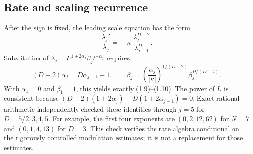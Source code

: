 \documentclass[10pt]{article}
\begin{document}
\subsection*{Rate and scaling recurrence}
After the sign is fixed, the leading scale equation has the form \[\frac{\lambda_j'}{\lambda_j}
   =-|\kappa|\frac{\lambda_j^{D-2}}{\lambda_{j-1}^{D}}.\] Substitution of \(\lambda_j=L^{1+2\alpha_j}\beta_jt^{-\alpha_j}\) requires \[(D-2)\alpha_j=D\alpha_{j-1}+1,\qquad
 \beta_j=\left(\frac{\alpha_j}{|\kappa|}\right)^{1/(D-2)}
          \beta_{j-1}^{D/(D-2)}.\] With \(\alpha_1=0\) and \(\beta_1=1\), this yields exactly (1.9)–(1.10). The power of \(L\) is consistent because \((D-2)(1+2\alpha_j)-D(1+2\alpha_{j-1})=0\). Exact rational arithmetic independently checked these identities through \(j=5\) for \(D=5/2,3,4,5\). For example, the first four exponents are \((0,2,12,62)\) for \(N=7\) and \((0,1,4,13)\) for \(D=3\). This check verifies the rate algebra conditional on the rigorously controlled modulation estimates; it is not a replacement for those estimates.\par
\end{document}
